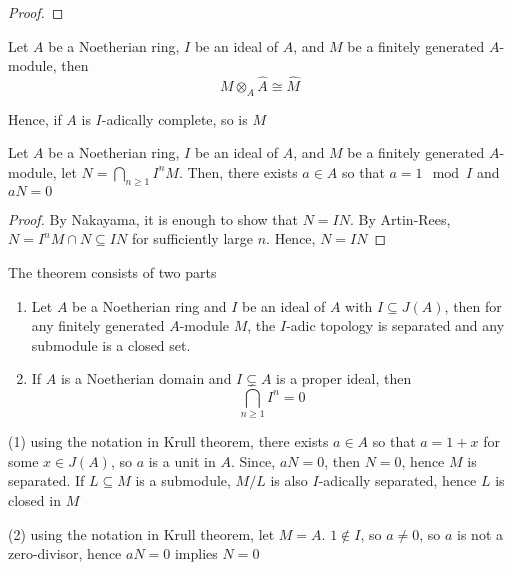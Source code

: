 \begin{proof}
\end{proof}

\begin{theorem}
	Let $A$ be a Noetherian ring, $I$ be an ideal of $A$, and $M$ be a finitely generated $A$-module, then
	$$
		M \otimes_A \hat{A} \cong \hat{M}
	$$
	
	Hence, if $A$ is $I$-adically complete, so is $M$
\end{theorem}

\begin{theorem}[Krull]
	Let $A$ be a Noetherian ring, $I$ be an ideal of $A$, and $M$ be a finitely generated $A$-module, let $N = \bigcap_{n \geq 1} I^n M$. Then, there exists $a \in A$ so that $a = 1 \mod I$ and $a N = 0$
\end{theorem}

\begin{proof}
	By Nakayama, it is enough to show that $N = IN$. By Artin-Rees, $N = I^n M \cap N \subseteq IN$ for sufficiently large $n$. Hence, $N = IN$
\end{proof}

\begin{theorem}
	The theorem consists of two parts
	\begin{enumerate}
		\item Let $A$ be a Noetherian ring and $I$ be an ideal of $A$ with $I \subseteq J(A)$, then for any finitely generated $A$-module $M$, the $I$-adic topology is separated and any submodule is a closed set.
		
		\item If $A$ is a Noetherian domain and $I \subsetneq A$ is a proper ideal, then 
		$$
			\bigcap_{n \geq 1} I^n = 0
		$$
	\end{enumerate}
\end{theorem}

\begin{longproof}
	(1) using the notation in Krull theorem, there exists $a \in A$ so that $a = 1 + x$ for some $x \in J(A)$, so $a$ is a unit in $A$. Since, $aN = 0$, then $N = 0$, hence $M$ is separated. If $L \subseteq M$ is a submodule, $M / L$ is also $I$-adically separated, hence $L$ is closed in $M$
		
	(2) using the notation in Krull theorem, let $M = A$. $1 \notin I$, so $a \neq 0$, so $a$ is not a zero-divisor, hence $aN = 0$ implies $N = 0$
\end{longproof}

